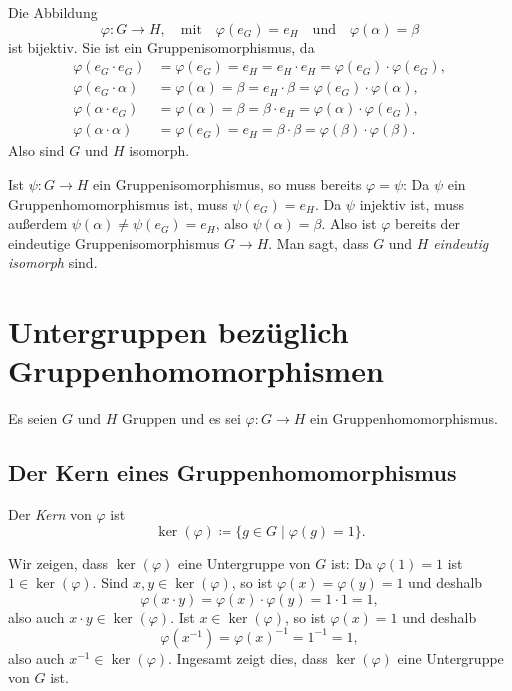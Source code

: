 Die Abbildung
\[
 \varphi \colon G \to H,
 \quad\text{mit}\quad
 \varphi(e_G) = e_H
 \quad\text{und}\quad
 \varphi(\alpha) = \beta
\]
ist bijektiv. Sie ist ein Gruppenisomorphismus, da
\begin{align*}
 \varphi(e_G \cdot e_G) &= \varphi(e_G) = e_H = e_H \cdot e_H = \varphi(e_G) \cdot \varphi(e_G), \\
 \varphi(e_G \cdot \alpha) &= \varphi(\alpha) = \beta = e_H \cdot \beta = \varphi(e_G) \cdot \varphi(\alpha), \\
 \varphi(\alpha \cdot e_G) &= \varphi(\alpha) = \beta = \beta \cdot e_H = \varphi(\alpha) \cdot \varphi(e_G), \\
 \varphi(\alpha \cdot \alpha) &= \varphi(e_G) = e_H = \beta \cdot \beta = \varphi(\beta) \cdot \varphi(\beta).
\end{align*}
Also sind $G$ und $H$ isomorph.

Ist $\psi \colon G \to H$ ein Gruppenisomorphismus, so muss bereits $\varphi = \psi$: Da $\psi$ ein Gruppenhomomorphismus ist, muss $\psi(e_G) = e_H$. Da $\psi$ injektiv ist, muss außerdem $\psi(\alpha) \neq \psi(e_G) = e_H$, also $\psi(\alpha) = \beta$. Also ist $\varphi$ bereits der eindeutige Gruppenisomorphismus $G \to H$. Man sagt, dass $G$ und $H$ \emph{eindeutig isomorph} sind.





\section{Untergruppen bezüglich Gruppenhomomorphismen}\label{sec: subgroups and group homomorphisms}
Es seien $G$ und $H$ Gruppen und es sei $\varphi \colon G \to H$ ein Gruppenhomomorphismus.



\subsection{Der Kern eines Gruppenhomomorphismus}
\begin{defi}
 Der \emph{Kern} von $\varphi$ ist
 \[
  \ker(\varphi) \coloneqq \{g \in G \mid \varphi(g) = 1\}.
 \]
\end{defi}

Wir zeigen, dass $\ker(\varphi)$ eine Untergruppe von $G$ ist: Da $\varphi(1) = 1$ ist $1 \in \ker(\varphi)$. Sind $x,y \in \ker(\varphi)$, so ist $\varphi(x) = \varphi(y) = 1$ und deshalb
\[
 \varphi(x \cdot y)
 = \varphi(x) \cdot \varphi(y)
 = 1 \cdot 1
 = 1,
\]
also auch $x \cdot y \in \ker(\varphi)$. Ist $x \in \ker(\varphi)$, so ist $\varphi(x) = 1$ und deshalb
\[
 \varphi(x^{-1})
 = \varphi(x)^{-1}
 = 1^{-1}
 = 1,
\]
also auch $x^{-1} \in \ker(\varphi)$. Ingesamt zeigt dies, dass $\ker(\varphi)$ eine Untergruppe von $G$ ist.


